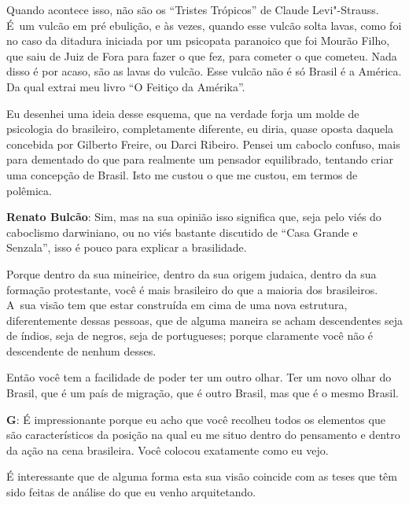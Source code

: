  

Quando acontece isso, não são os ``Tristes Trópicos'' de Claude
Levi"-Strauss. É~um vulcão em pré ebulição, e às vezes, quando esse vulcão
solta lavas, como foi no caso da ditadura iniciada por um psicopata
paranoico que foi Mourão Filho, que saiu de Juiz de Fora para fazer o
que fez, para cometer o que cometeu. Nada disso é por acaso, são as
lavas do vulcão. Esse vulcão não é só Brasil é a América. Da qual extrai
meu livro ``O Feitiço da Amérika''.

 

Eu desenhei uma ideia desse esquema, que na verdade forja um molde de
psicologia do brasileiro, completamente diferente, eu diria, quase
oposta daquela concebida por Gilberto Freire, ou Darci Ribeiro. Pensei
um caboclo confuso, mais para dementado do que para realmente um
pensador equilibrado, tentando criar uma concepção de Brasil. Isto me
custou o que me custou, em termos de polêmica.

 

\textbf{Renato Bulcão}: Sim, mas na sua opinião isso significa que, seja
pelo viés do caboclismo darwiniano, ou no viés bastante discutido de
``Casa Grande e Senzala'', isso é pouco para explicar a brasilidade.

 

Porque dentro da sua mineirice, dentro da sua origem judaica, dentro da
sua formação protestante, você é mais brasileiro do que a maioria dos
brasileiros. A~sua visão tem que estar construída em cima de uma nova
estrutura, diferentemente dessas pessoas, que de alguma maneira se acham
descendentes seja de índios, seja de negros, seja de portugueses; porque
claramente você não é descendente de nenhum desses.

 

Então você tem a facilidade de poder ter um outro olhar. Ter um novo
olhar do Brasil, que é um país de migração, que é outro Brasil, mas que é
o mesmo Brasil.

 

\textbf{G}: É impressionante porque eu acho que você recolheu todos os
elementos que são característicos da posição na qual eu me situo dentro
do pensamento e dentro da ação na cena brasileira. Você colocou
exatamente como eu vejo.

 

É interessante que de alguma forma esta sua visão coincide com as teses
que têm sido feitas de análise do que eu venho arquitetando.

 

